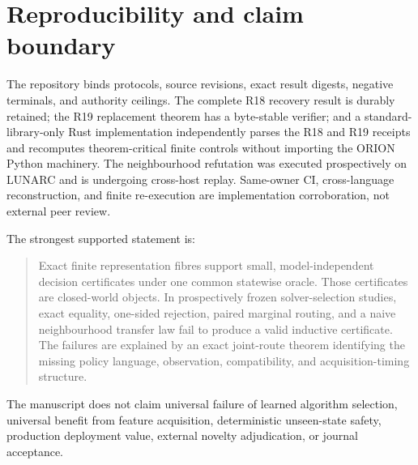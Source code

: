 \documentclass[11pt]{article}
\theoremstyle{definition}
\theoremstyle{remark}
\begin{document}
\section{Reproducibility and claim boundary}

The repository binds protocols, source revisions, exact result digests, negative terminals, and authority ceilings.  The complete R18 recovery result is durably retained; the R19 replacement theorem has a byte-stable verifier; and a standard-library-only Rust implementation independently parses the R18 and R19 receipts and recomputes theorem-critical finite controls without importing the ORION Python machinery.  The neighbourhood refutation was executed prospectively on LUNARC and is undergoing cross-host replay.  Same-owner CI, cross-language reconstruction, and finite re-execution are implementation corroboration, not external peer review.

The strongest supported statement is:

\begin{quote}
Exact finite representation fibres support small, model-independent decision certificates under one common statewise oracle.  Those certificates are closed-world objects.  In prospectively frozen solver-selection studies, exact equality, one-sided rejection, paired marginal routing, and a naive neighbourhood transfer law fail to produce a valid inductive certificate.  The failures are explained by an exact joint-route theorem identifying the missing policy language, observation, compatibility, and acquisition-timing structure.
\end{quote}

The manuscript does not claim universal failure of learned algorithm selection, universal benefit from feature acquisition, deterministic unseen-state safety, production deployment value, external novelty adjudication, or journal acceptance.



\end{document}
